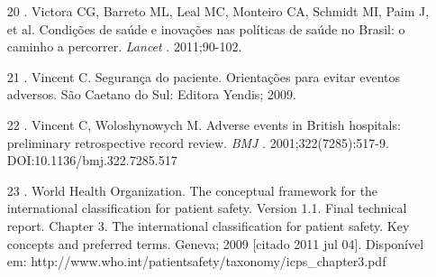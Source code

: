 \documentclass{article}
\begin{document}
\begin{itemize}
\item[20] . Victora CG, Barreto ML, Leal MC, Monteiro CA, Schmidt MI, Paim J, et
al.
Condições de saúde e inovações nas políticas de saúde no Brasil: o caminho a
percorrer.
\textit{Lancet}
. 2011;90-102.

\item[21] . Vincent C. Segurança do paciente. Orientações para evitar eventos
adversos. São Caetano do Sul: Editora Yendis; 2009.

\item[22] . Vincent C, Woloshynowych M. Adverse events in British hospitals:
preliminary retrospective record review. \textit{BMJ}
. 2001;322(7285):517-9.
DOI:10.1136/bmj.322.7285.517

\item[23] . World Health Organization. The conceptual framework for the
international
classification for patient safety. Version 1.1. Final technical report. Chapter
3. The
international classification for patient safety. Key concepts and preferred
terms. Geneva;
2009 [citado 2011 jul 04]. Disponível em:
http://www.who.int/patientsafety/taxonomy/icps\_{}chapter3.pdf

\end{itemize}
\end{document}

